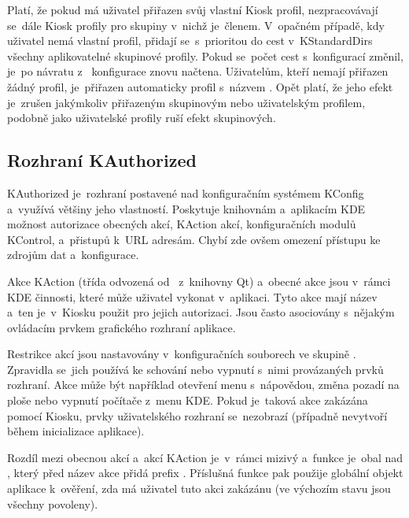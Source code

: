 Platí, že pokud má uživatel přiřazen svůj vlastní Kiosk profil, nezpracovávají se~dále Kiosk profily pro skupiny v~nichž je~členem. V~opačném případě, kdy uživatel nemá vlastní profil, přidají se~s~prioritou do cest v~KStandardDirs všechny aplikovatelné skupinové profily. Pokud se~počet cest s~konfigurací změnil, je~po návratu z~ konfigurace znovu načtena. Uživatelům, kteří nemají přiřazen žádný profil, je~přiřazen automaticky profil s~názvem . Opět platí, že jeho efekt je~zrušen jakýmkoliv přiřazeným skupinovým nebo uživatelským profilem, podobně jako uživatelské profily ruší efekt skupinových.

\subsection*{Rozhraní KAuthorized}
KAuthorized je~rozhraní postavené nad konfiguračním systémem KConfig a~využívá většiny jeho vlastností. Poskytuje knihovnám a~aplikacím KDE možnost autorizace obecných akcí, KAction akcí, konfiguračních modulů KControl, a~přistupů k~URL adresám. Chybí zde ovšem omezení přístupu ke zdrojům dat a~konfigurace.

Akce KAction (třída  odvozená od~ z~knihovny Qt) a~obecné akce jsou v~rámci KDE činnosti, které může uživatel vykonat v~aplikaci. Tyto akce mají název a~ten je~v~Kiosku použit pro jejich autorizaci. Jsou často asociovány s~nějakým ovládacím prvkem grafického rozhraní aplikace.

Restrikce akcí jsou nastavovány v~konfiguračních souborech ve skupině \linebreak{}. Zpravidla se~jich používá ke schování nebo vypnutí s~nimi provázaných prvků rozhraní. Akce může být například otevření menu s~nápovědou, změna pozadí na ploše nebo vypnutí počítače z~menu KDE. Pokud je~taková akce zakázána pomocí Kiosku, prvky uživatelského rozhraní se~nezobrazí (případně nevytvoří během inicializace aplikace).

Rozdíl mezi obecnou akcí a~akcí KAction je~v~rámci  mizivý a~funkce \linebreak{} je~obal nad , který před název akce přidá prefix . Příslušná funkce pak použije globální  objekt aplikace k~ověření, zda má uživatel tuto akci zakázánu (ve výchozím stavu jsou všechny povoleny).

